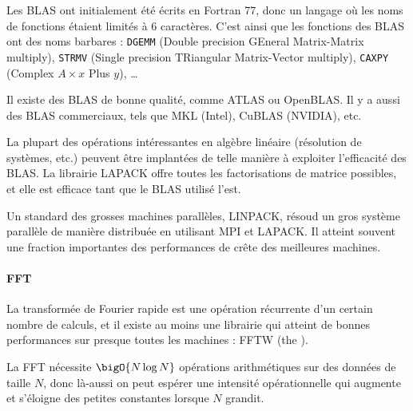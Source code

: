 \begin{danger}
  Les BLAS ont initialement été écrits en Fortran 77, donc un langage où les
  noms de fonctions étaient limités à 6 caractères. C'est ainsi que les
  fonctions des BLAS ont des noms barbares : \texttt{DGEMM} (Double precision
  GEneral Matrix-Matrix multiply), \texttt{STRMV} (Single precision TRiangular
  Matrix-Vector multiply), \texttt{CAXPY} (Complex $A \times x$ Plus $y$), \dots
\end{danger}

Il existe des BLAS  de bonne qualité, comme ATLAS ou
OpenBLAS. Il y a aussi des BLAS commerciaux, tels que MKL (Intel), CuBLAS
(NVIDIA), etc.

La plupart des opérations intéressantes en algèbre linéaire (résolution de
systèmes, etc.) peuvent être implantées de telle manière à exploiter
l'efficacité des BLAS. La librairie LAPACK offre toutes les factorisations de
matrice possibles, et elle est efficace tant que le BLAS utilisé l'est.

Un  standard des grosses machines parallèles, LINPACK, résoud
un gros système parallèle de manière distribuée en utilisant MPI et LAPACK. Il
atteint souvent une fraction importantes des performances de crête des
meilleures machines.

\paragraph{FFT} La transformée de Fourier rapide est une opération récurrente
d'un certain nombre de calculs, et il existe au moins une librairie qui atteint
de bonnes performances sur presque toutes les machines : FFTW (the
).

La FFT nécessite $\bigO{N \log N}$ opérations arithmétiques sur des données de
taille $N$, donc là-aussi on peut espérer une intensité opérationnelle qui
augmente et s'éloigne des petites constantes lorsque $N$ grandit.







